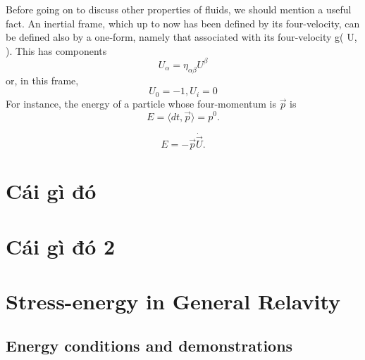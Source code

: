 \documentclass{article}
\begin{document}
Before going on to discuss other properties of fluids, we should mention a useful fact. An inertial frame, which up to now has been defined by its four-velocity, can be defined also by a one-form, namely that associated with its four-velocity g( U, ). This has components
$$ U_\alpha = \eta_{\alpha \beta} U^\beta$$
or, in this frame,
$$ U_0 = -1, U_i = 0 $$
For instance, the energy of a particle whose four-momentum
is $\vec{p}$ is
$$ E = \langle dt, \vec{p} \rangle = p^0. $$

$$ E = -\vec{p} \dot \vec{U}. $$

\section{Cái gì đó}
\section{Cái gì đó 2}
\section{Stress-energy in General Relavity}
\subsection{Energy conditions and demonstrations}
\end{document}
